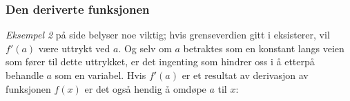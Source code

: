 \subsubsection{Den deriverte funksjonen}
\textsl{Eksempel 2} på side \pageref{dereks2} belyser noe viktig; hvis grenseverdien gitt i  eksisterer, vil $ f'(a) $ være uttrykt ved $ a $. Og selv om $ a $ betraktes som en konstant langs veien som fører til dette uttrykket, er det ingenting som hindrer oss i å etterpå behandle $ a $ som en variabel. Hvis $ f'(a) $ er et resultat av derivasjon av funksjonen $ f(x) $ er det også hendig å omdøpe $ a $ til $ x $:\regv
{}
 \regv

